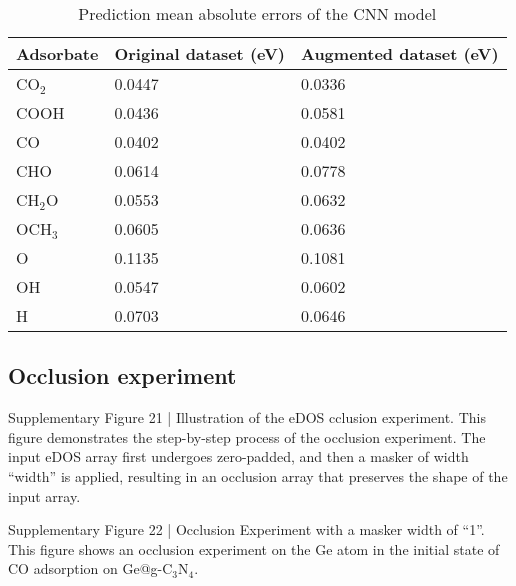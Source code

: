 \begin{table}[h]
  \centering
  \begin{tabular}{lll}
    \hline
    \textbf{Adsorbate} & \textbf{Original dataset (eV)} & \textbf{Augmented dataset (eV)} \\
    \hline
    CO$_2$  & 0.0447 & 0.0336 \\
    COOH    & 0.0436 & 0.0581 \\
    CO      & 0.0402 & 0.0402 \\
    CHO     & 0.0614 & 0.0778 \\
    CH$_2$O & 0.0553 & 0.0632 \\
    OCH$_3$ & 0.0605 & 0.0636 \\
    O       & 0.1135 & 0.1081 \\
    OH      & 0.0547 & 0.0602 \\
    H       & 0.0703 & 0.0646 \\
    \hline
  \end{tabular}
  \caption{Prediction mean absolute errors of the CNN model}
  \label{si_table18}
\end{table}


\subsection{Occlusion experiment}


Supplementary Figure 21 | Illustration of the eDOS cclusion experiment. This figure demonstrates the step-by-step process of the occlusion experiment. The input eDOS array first undergoes zero-padded, and then a masker of width “width” is applied, resulting in an occlusion array that preserves the shape of the input array.


Supplementary Figure 22 | Occlusion Experiment with a masker width of “1”. This figure shows an occlusion experiment on the Ge atom in the initial state of CO adsorption on Ge@g-C$_3$N$_4$.


